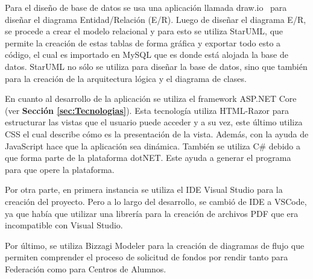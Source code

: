 Para el diseño de base de datos se usa una aplicación llamada draw.io~\cite{20} para diseñar el diagrama Entidad/Relación (E/R). Luego de diseñar el diagrama E/R, se procede a crear el modelo relacional y para esto se utiliza StarUML, que permite la creación de estas tablas de forma gráfica y exportar todo esto a código, el cual es importado en MySQL que es donde está alojada la base de datos. StarUML no sólo se utiliza para diseñar la base de datos, sino que también para la creación de la arquitectura lógica y el diagrama de clases. 

En cuanto al desarrollo de la aplicación se utiliza el framework ASP.NET Core (ver \textbf{Sección \ref{sec:Tecnologias}}). Esta tecnología utiliza HTML-Razor para estructurar las vistas que el usuario puede acceder y a su vez, este último utiliza CSS el cual describe cómo es la presentación de la vista. Además, con la ayuda de JavaScript hace que la aplicación sea dinámica. También se utiliza C\# debido a que forma parte de la plataforma dotNET. Este ayuda a generar el programa para que opere la plataforma. 

 Por otra parte, en primera instancia se utiliza el IDE Visual Studio para la creación del proyecto. Pero a lo largo del desarrollo, se cambió de IDE a VSCode, ya que había que utilizar una librería para la creación de archivos PDF que era incompatible con Visual Studio.

Por último, se utiliza Bizzagi Modeler para la creación de diagramas de flujo que permiten comprender el proceso de solicitud de fondos por rendir tanto para Federación como para Centros de Alumnos.